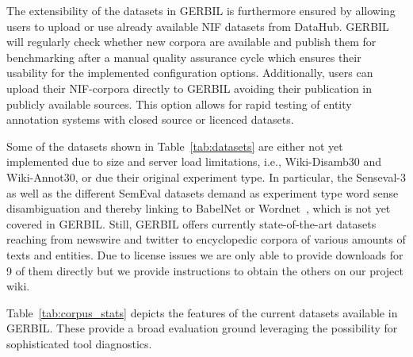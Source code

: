 The extensibility of the datasets in GERBIL is furthermore ensured by allowing users to upload or use already available NIF datasets from DataHub. 
GERBIL will regularly check whether new corpora are available and publish them for benchmarking after a manual quality assurance cycle which ensures their usability for the implemented configuration options.
Additionally, users can upload their NIF-corpora directly to GERBIL avoiding their publication in publicly available sources.
This option allows for rapid testing of entity annotation systems with closed source or licenced datasets.

Some of the datasets shown in Table~\ref{tab:datasets} are either not yet implemented due to size and server load limitations, i.e., Wiki-Disamb30 and Wiki-Annot30, or due their original experiment type.
In particular, the Senseval-3 as well as the different SemEval datasets demand as experiment type word sense disambiguation and thereby linking to BabelNet or Wordnet~\cite{Wordnet}, which is not yet covered in GERBIL.
Still, GERBIL offers currently \overalldatasets state-of-the-art datasets reaching from newswire and twitter to encyclopedic corpora of various amounts of texts and entities.
Due to license issues we are only able to provide downloads for 9 of them directly but we provide instructions to obtain the others on our project wiki.

Table~\ref{tab:corpus_stats} depicts the features of the current datasets available in GERBIL.
These provide a broad evaluation ground leveraging the possibility for sophisticated tool diagnostics.


